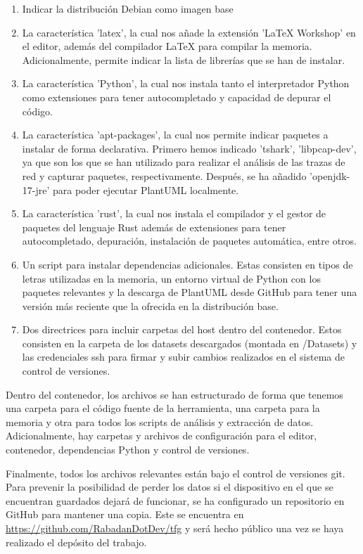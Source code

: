 \begin{enumerate}
    \item Indicar la distribución Debian como imagen base
    \item La característica 'latex', la cual nos añade la extensión 'LaTeX Workshop' en el editor, además del compilador LaTeX para compilar la memoria. Adicionalmente, permite indicar la lista de librerías que se han de instalar.
    \item La característica 'Python', la cual nos instala tanto el interpretador Python como extensiones para tener autocompletado y capacidad de depurar el código.
    \color{blue} %
    \item La característica 'apt-packages', la cual nos permite indicar paquetes a instalar de forma declarativa. Primero hemos indicado 'tshark', 'libpcap-dev', ya que son los que se han utilizado para realizar el análisis de las trazas de red y capturar paquetes, respectivamente. Después, se ha añadido 'openjdk-17-jre' para poder ejecutar PlantUML localmente.
    \color{black} %
    \item La característica 'rust', la cual nos instala el compilador y el gestor de paquetes del lenguaje Rust además de extensiones para tener autocompletado, depuración, instalación de paquetes automática, entre otros.
    \color{blue} %
    \item Un script para instalar dependencias adicionales. Estas consisten en tipos de letras utilizadas en la memoria, un entorno virtual de Python con los paquetes relevantes y la descarga de PlantUML desde GitHub para tener una versión más reciente que la ofrecida en la distribución base.
    \color{black} %
    \item Dos directrices para incluir carpetas del host dentro del contenedor. Estos consisten en la carpeta de los datasets descargados (montada en /Datasets) y las credenciales \acrshort{ssh} para firmar y subir cambios realizados en el sistema de control de versiones.
\end{enumerate}

Dentro del contenedor, los archivos se han estructurado de forma que tenemos una carpeta para el código fuente de la herramienta, una carpeta para la memoria y otra para todos los scripts de análisis y extracción de datos. Adicionalmente, hay carpetas y archivos de configuración para el editor, contenedor, dependencias Python y control de versiones.

Finalmente, todos los archivos relevantes están bajo el control de versiones git. Para prevenir la posibilidad de perder los datos si el dispositivo en el que se encuentran guardados dejará de funcionar, se ha configurado un repositorio en GitHub para mantener una copia. Este se encuentra en \url{https://github.com/RabadanDotDev/tfg} y será hecho público una vez se haya realizado el depósito del trabajo.
